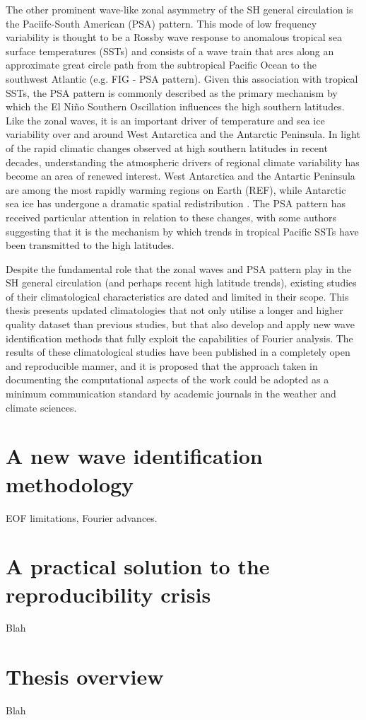 The other prominent wave-like zonal asymmetry of the SH general circulation is the Paciifc-South American (PSA) pattern. This mode of low frequency variability is thought to be a Rossby wave response to anomalous tropical sea surface temperatures (SSTs) and consists of a wave train that arcs along an approximate great circle path from the subtropical Pacific Ocean to the southwest Atlantic (e.g. FIG - PSA pattern). Given this association with tropical SSTs, the PSA pattern is commonly described as the primary mechanism by which the El Ni\~{n}o Southern Oscillation influences the high southern latitudes. Like the zonal waves, it is an important driver of temperature and sea ice variability over and around West Antarctica and the Antarctic Peninsula. In light of the rapid climatic changes observed at high southern latitudes in recent decades, understanding the atmospheric drivers of regional climate variability has become an area of renewed interest. West Antarctica and the Antartic Peninsula are among the most rapidly warming regions on Earth (REF), while Antarctic sea ice has undergone a dramatic spatial redistribution \citep{Simmonds2015}. The PSA pattern has received particular attention in relation to these changes, with some authors suggesting that it is the mechanism by which trends in tropical Pacific SSTs have been transmitted to the high latitudes.

Despite the fundamental role that the zonal waves and PSA pattern play in the SH general circulation (and perhaps recent high latitude trends), existing studies of their climatological characteristics are dated and limited in their scope. This thesis presents updated climatologies that not only utilise a longer and higher quality dataset than previous studies, but that also develop and apply new wave identification methods that fully exploit the capabilities of Fourier analysis. The results of these climatological studies have been published in a completely open and reproducible manner, and it is proposed that the approach taken in documenting the computational aspects of the work could be adopted as a minimum communication standard by academic journals in the weather and climate sciences.


\section{A new wave identification methodology}

EOF limitations, Fourier advances.

\section{A practical solution to the reproducibility crisis}

Blah

\section{Thesis overview}

Blah
 